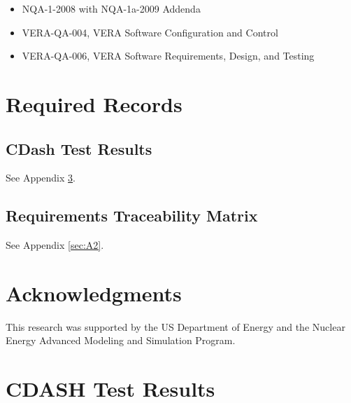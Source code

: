 \documentclass{vera-ornltm}
\begin{document}
\begin{itemize}
    \item NQA-1-2008 with NQA-1a-2009 Addenda \cite{NQA12008}
    \item VERA-QA-004, VERA Software Configuration and Control
    \item VERA-QA-006, VERA Software Requirements, Design, and Testing
\end{itemize}


\section{Required Records}

\subsection{CDash Test Results}
See Appendix \ref{sec:A1}.
\subsection{Requirements Traceability Matrix}
See Appendix \ref{sec:A2}.

\section{Acknowledgments}

This research was supported by the US Department of Energy and the Nuclear Energy Advanced Modeling and Simulation Program.


\clearpage
{}
{}



\appendix
\section{CDASH Test Results}
\label{sec:A1}
\end{document}
